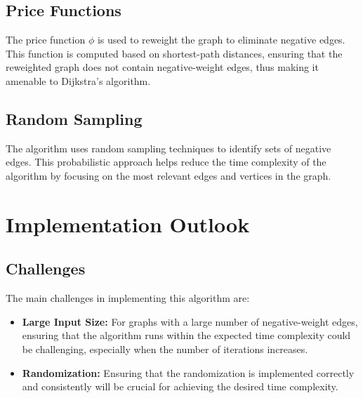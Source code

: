 \documentclass[12pt]{article}
\begin{document}
\subsection*{Price Functions}
The price function \( \phi \) is used to reweight the graph to eliminate negative edges. This function is computed based on shortest-path distances, ensuring that the reweighted graph does not contain negative-weight edges, thus making it amenable to Dijkstra's algorithm.

\subsection*{Random Sampling}
The algorithm uses random sampling techniques to identify sets of negative edges. This probabilistic approach helps reduce the time complexity of the algorithm by focusing on the most relevant edges and vertices in the graph.

\section*{Implementation Outlook}

\subsection*{Challenges}
The main challenges in implementing this algorithm are:
\begin{itemize}
    \item \textbf{Large Input Size:} For graphs with a large number of negative-weight edges, ensuring that the algorithm runs within the expected time complexity could be challenging, especially when the number of iterations increases.
    \item \textbf{Randomization:} Ensuring that the randomization is implemented correctly and consistently will be crucial for achieving the desired time complexity.
\end{itemize}
\end{document}
